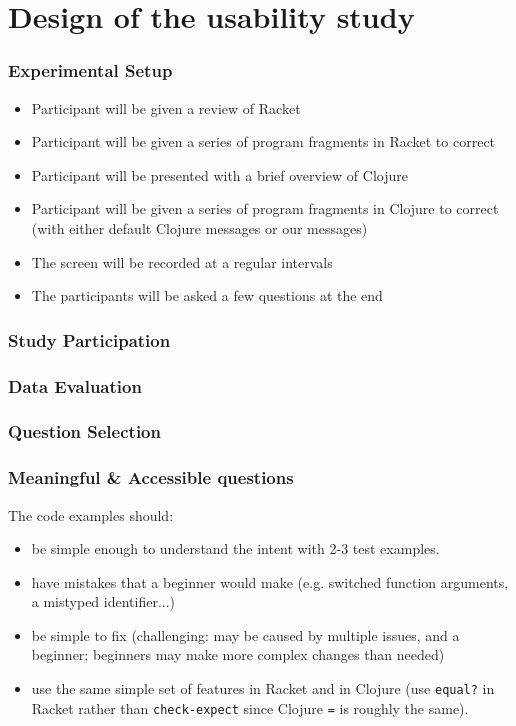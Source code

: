 \documentclass{beamer}
\begin{document}

\section{Design of the usability study} 

\begin{frame}
\frametitle{Experimental Setup}
\begin{itemize}
\item Participant will be given a review of Racket
\item Participant will be given a series of program fragments in Racket to correct
\item Participant will be presented with a brief overview of Clojure
\item Participant will be given a series of  program fragments in Clojure to correct (with either default Clojure messages or our messages) 
\item The screen will be recorded at a regular intervals
\item The participants will be asked a few questions at the end
\end{itemize}
\end{frame}

\begin{frame}
\frametitle{Study Participation}
\end{frame}

\begin{frame}
\frametitle{Data Evaluation}
\end{frame}


\begin{frame}
\frametitle{Question Selection}
\end{frame}

\begin{frame}
	\frametitle{Meaningful \& Accessible questions}
The code examples should: 
	\begin{itemize}
		\item be simple enough to understand the intent with 2-3 test examples. 
		\item have mistakes that a beginner would make (e.g. switched function arguments, a mistyped identifier...) 
		\item be simple to fix (challenging: may  be caused by multiple issues, and a beginner; beginners may make more complex changes than needed)
		\item use the same simple set of features in Racket and in Clojure (use \texttt{equal?} in Racket rather than \texttt{check-expect} since Clojure {\tt =} is roughly the same). 
	\end{itemize}
\end{frame}
\end{document}
